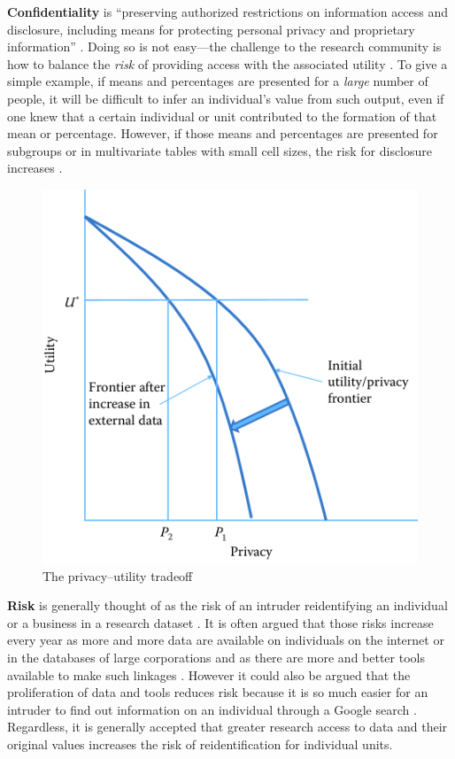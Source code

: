 \documentclass[]{krantz}
\begin{document}
\textbf{Confidentiality} is ``preserving authorized restrictions on
information access and disclosure, including means for protecting
personal privacy and proprietary information''
\citep{mccallister2010sp}. Doing so is not easy---the challenge to the
research community is how to balance the \emph{risk} of providing access
with the associated utility \citep{duncanstatistical}. To give a simple
example, if means and percentages are presented for a \emph{large}
number of people, it will be difficult to infer an individual's value
from such output, even if one knew that a certain individual or unit
contributed to the formation of that mean or percentage. However, if
those means and percentages are presented for subgroups or in
multivariate tables with small cell sizes, the risk for disclosure
increases \citep{doyle2001confidentiality}.

\begin{figure}

{\centering \includegraphics[width=0.7\linewidth]{ChapterPrivacy/figures/fig11-1} 

}

\caption{The privacy--utility tradeoff}\label{fig:fig11-1}
\end{figure}

\textbf{Risk} is generally thought of as the risk of an intruder
reidentifying an individual or a business in a research dataset
\citep{duncan2004disclosure}. It is often argued that those risks
increase every year as more and more data are available on individuals
on the internet or in the databases of large corporations and as there
are more and better tools available to make such linkages
\citep[\citet{herzog2007data}]{shlomo2014probabilistic}. However it
could also be argued that the proliferation of data and tools reduces
risk because it is so much easier for an intruder to find out
information on an individual through a Google search \citep{Lane2020}.
Regardless, it is generally accepted that greater research access to
data and their original values increases the risk of reidentification
for individual units.
\end{document}
